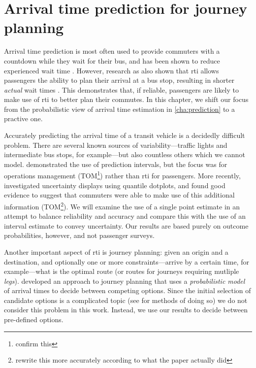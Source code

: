 
\chapter{Arrival time prediction for journey planning}
\label{cha:etas}

Arrival time prediction is most often used to provide commuters with a countdown while they wait for their bus, and has been shown to reduce experienced wait time \citep{cn}. However, research as also shown that \gls{rti} allows passengers the ability to plan their arrival at a bus stop, resulting in shorter \emph{actual} wait times \citep{cn}. This demonstrates that, if reliable, passengers are likely to make use of \gls{rti} to better plan their commutes. In this chapter, we shift our focus from the probabilistic view of arrival time estimation in \cref{cha:prediction} to a practive one.


Accurately predicting the arrival time of a transit vehicle is a decidedly difficult problem. There are several known sources of variability---traffic lights and intermediate bus stops, for example---but also countless others which we cannot model. \citet{Mazloumi_2011} demonstrated the use of prediction intervals, but the focus was for operations management (TOM\footnote{confirm this}) rather than \gls{rti} for passengers. More recently, \citet{Fernandes_2018} investigated uncertainty displays using quantile dotplots, and found good evidence to suggest that commuters were able to make use of this additional information (TOM\footnote{rewrite this more accurately according to what the paper actually did}). We will examine the use of a single point estimate in an attempt to balance reliability and accuracy and compare this with the use of an interval estimate to convey uncertainty. Our results are based purely on outcome probabilities, however, and not passenger surveys.


Another important aspect of \gls{rti} is journey planning: given an origin and a destination, and optionally one or more constraints---arrive by a certain time, for example---what is the optimal route (or routes for journeys requiring mutliple \emph{legs}).  developed an approach to journey planning that uses a \emph{probabilistic model} of arrival times to decide between competing options. Since the initial selection of candidate options is a complicated topic (see \citet{Hame_2013a,Hame_2013b,Zheng_2016} for methods of doing so) we do not consider this problem in this work. Instead, we use our results to decide between pre-defined options.


